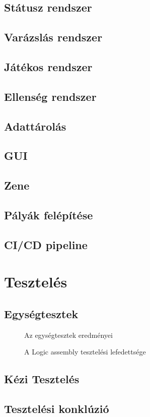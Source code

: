 \subsection{Státusz rendszer}

\subsection{Varázslás rendszer}

\subsection{Játékos rendszer}

\subsection{Ellenség rendszer}

\subsection{Adattárolás}

\subsection{GUI}

\subsection{Zene}

\subsection{Pályák felépítése}

\subsection{CI/CD pipeline}


\section{Tesztelés}

\subsection{Egységtesztek}

\begin{figure}[H]
	\noindent{}
	\caption{Az egységtesztek eredményei}
	\label{tests}
\end{figure}

\begin{figure}[H]
	\noindent{}
	\caption{A Logic assembly tesztelési lefedettsége}
	\label{codeCoverage}
\end{figure}


\subsection{Kézi Tesztelés}

\subsection{Tesztelési konklúzió}